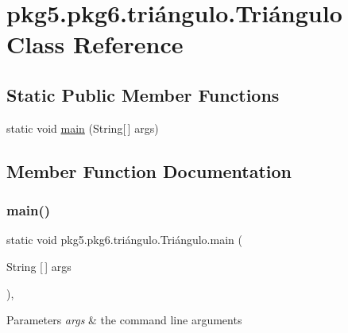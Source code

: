 \hypertarget{classpkg5_1_1pkg6_1_1tri_xC3_xA1ngulo_1_1_tri_xC3_xA1ngulo}{}\section{pkg5.\+pkg6.\+triángulo.\+Triángulo Class Reference}
\label{classpkg5_1_1pkg6_1_1tri_xC3_xA1ngulo_1_1_tri_xC3_xA1ngulo}
\subsection*{Static Public Member Functions}
\begin{DoxyCompactItemize}
\item 
static void \mbox{\hyperlink{classpkg5_1_1pkg6_1_1tri_xC3_xA1ngulo_1_1_tri_xC3_xA1ngulo_aa2c3b344907ae4a95559d2242c2a1c5d}{main}} (String\mbox{[}$\,$\mbox{]} args)
\end{DoxyCompactItemize}


\subsection{Member Function Documentation}
\mbox{\label{classpkg5_1_1pkg6_1_1tri_xC3_xA1ngulo_1_1_tri_xC3_xA1ngulo_aa2c3b344907ae4a95559d2242c2a1c5d}} 
\subsubsection{\texorpdfstring{main()}{main()}}
{\footnotesize\ttfamily static void pkg5.\+pkg6.\+triángulo.\+Triángulo.\+main (\begin{DoxyParamCaption}\item[{String \mbox{[}$\,$\mbox{]}}]{args }\end{DoxyParamCaption})\hspace{0.3cm}{\ttfamily [inline]}, {\ttfamily [static]}}


\begin{DoxyParams}{Parameters}
{\em args} & the command line arguments \\
\hline
\end{DoxyParams}

